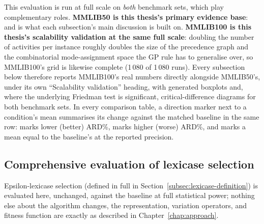 This evaluation is run at full scale on \emph{both} benchmark sets, which
play complementary roles. \textbf{MMLIB50 is this thesis's primary evidence
base}:  and is
what each subsection's main
discussion is built on. \textbf{MMLIB100 is this thesis's scalability
validation at the same full scale}: doubling the number of activities per
instance roughly doubles the size of the precedence graph and the
combinatorial mode-assignment space the GP rule has to generalise over, so
 MMLIB100's grid is likewise complete (1\,080 of 1\,080
runs). Every subsection below therefore reports MMLIB100's real numbers
directly alongside MMLIB50's, under its own ``Scalability validation''
heading, with generated boxplots and, where the underlying Friedman test is
significant, critical-difference diagrams for both benchmark sets. In every
comparison table, a direction marker next to a condition's mean summarises
its change against the matched baseline in the same row:
\ArrBetter{} marks lower (better) ARD\%, \ArrWorse{} marks higher (worse)
ARD\%, and \ArrSame{} marks a mean equal to the baseline's at the reported
precision.

\subsection{Comprehensive evaluation of lexicase selection}
\label{subsec:lexicase-eval}

Epsilon-lexicase selection (defined in full in
Section~\ref{subsec:lexicase-definition}) is evaluated here, unchanged,
against the baseline at full statistical power; nothing else about the
algorithm changes, the representation, variation operators, and fitness
function are exactly as described in Chapter~\ref{chap:approach}.

